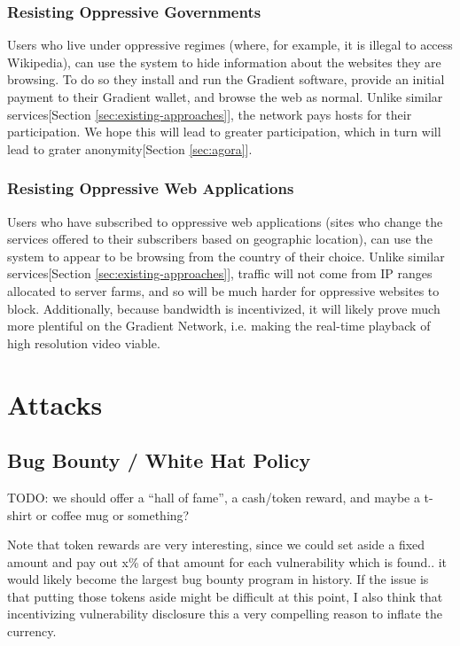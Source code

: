 \documentclass{article}
\begin{document}
\subsubsection{Resisting Oppressive Governments}

Users who live under oppressive regimes (where, for example, it is illegal to access Wikipedia), can use the system to hide information about the websites they are browsing. To do so they install and run the Gradient software, provide an initial payment to their Gradient wallet, and browse the web as normal. Unlike similar services[Section \ref{sec:existing-approaches}], the network pays hosts for their participation. We hope this will lead to greater participation, which in turn will lead to grater anonymity[Section \ref{sec:agora}].

\subsubsection{Resisting Oppressive Web Applications}

Users who have subscribed to oppressive web applications (sites who change the services offered to their subscribers based on geographic location), can use the system to appear to be browsing from the country of their choice. Unlike similar services[Section \ref{sec:existing-approaches}], traffic will not come from IP ranges allocated to server farms, and so will be much harder for oppressive websites to block. Additionally, because bandwidth is incentivized, it will likely prove much more plentiful on the Gradient Network, i.e. making the real-time playback of high resolution video viable.

\section{Attacks}
\label{sec:attacks}

\subsection{Bug Bounty / White Hat Policy}

TODO: we should offer a “hall of fame”, a cash/token reward, and maybe a t-shirt or coffee mug or something?

Note that token rewards are very interesting, since we could set aside a fixed amount and pay out x\% of that amount for each vulnerability which is found.. it would likely become the largest bug bounty program in history. If the issue is that putting those tokens aside might be difficult at this point, I also think that incentivizing vulnerability disclosure this a very compelling reason to inflate the currency.
\end{document}
